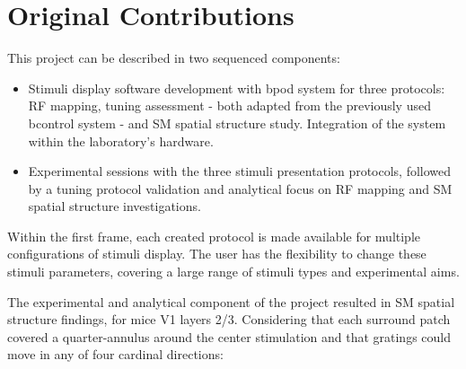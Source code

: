 \section{Original Contributions}
\label{sec:int_contributions}

This project can be described in two sequenced components:

\begin{itemize}
\item Stimuli display software development with bpod system for three protocols: RF mapping, tuning assessment - both adapted from the previously used bcontrol system - and SM spatial structure study. Integration of the system within the laboratory's hardware.

\item Experimental sessions with the three stimuli presentation protocols, followed by a tuning protocol validation and analytical focus on RF mapping and SM spatial structure investigations.
\end{itemize}

Within the first frame, each created protocol is made available for multiple configurations of stimuli display. The user has the flexibility to change these stimuli parameters, covering a large range of stimuli types and experimental aims.

The experimental and analytical component of the project resulted in SM spatial structure findings, for mice V1 layers 2/3. Considering that each surround patch covered a quarter-annulus around the center stimulation and that gratings could move in any of four cardinal directions:

